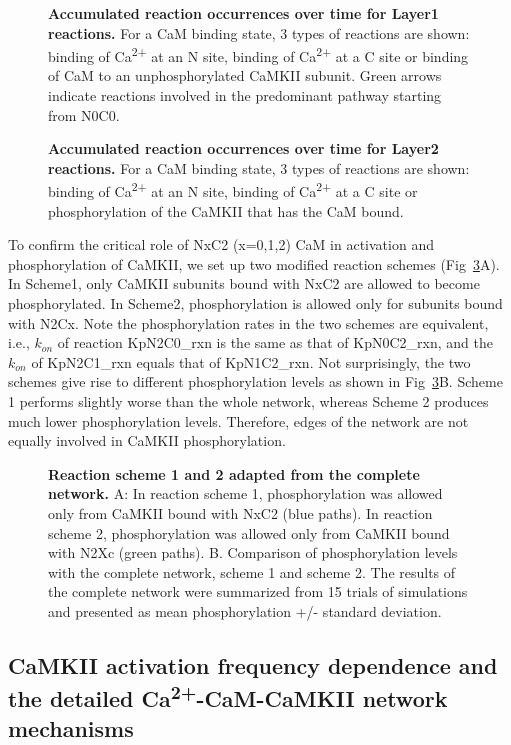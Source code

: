 \documentclass[10pt,letterpaper]{article}
\begin{document}
\begin{figure}[!h]
	\caption{{\bf Accumulated reaction occurrences over time for Layer1 reactions.}
	For a CaM binding state, 3 types of reactions are shown: binding of Ca\textsuperscript{2+} at an N site, binding of Ca\textsuperscript{2+} at a C site or binding of CaM to an unphosphorylated CaMKII subunit. Green arrows indicate reactions involved in the predominant pathway starting from N0C0.
	}
\label{fig4}
\end{figure}

\begin{figure}[!h]
	\caption{{\bf Accumulated reaction occurrences over time for Layer2 reactions.}
	For a CaM binding state, 3 types of reactions are shown: binding of Ca\textsuperscript{2+} at an N site, binding of Ca\textsuperscript{2+} at a C site or phosphorylation of the CaMKII that has the CaM bound.
	}
\label{fig5}
\end{figure}


To confirm the critical role of NxC2 (x=0,1,2) CaM in activation and phosphorylation of CaMKII, we set up two modified reaction schemes (Fig~\ref{fig6}A). In Scheme1, only CaMKII subunits bound with NxC2 are allowed to become phosphorylated. In Scheme2, phosphorylation is allowed only for subunits bound with N2Cx. Note the phosphorylation rates in the two schemes are equivalent, i.e., $k_{on}$ of reaction KpN2C0\_rxn is the same as that of KpN0C2\_rxn, and the $k_{on}$ of KpN2C1\_rxn equals that of KpN1C2\_rxn. Not surprisingly, the two schemes give rise to different phosphorylation levels as shown in Fig~\ref{fig6}B. Scheme 1 performs slightly worse than the whole network, whereas Scheme 2 produces much lower phosphorylation levels. Therefore, edges of the network are not equally involved in CaMKII phosphorylation. 

\begin{figure}[!h]
	\caption{{\bf Reaction scheme 1 and 2 adapted from the complete network.}
	A: In reaction scheme 1, phosphorylation was allowed only from CaMKII bound with NxC2 (blue paths). In reaction scheme 2, phosphorylation was allowed only from CaMKII bound with N2Xc (green paths).
	B. Comparison of phosphorylation levels with the complete network, scheme 1 and scheme 2. The results of the complete network were summarized from 15 trials of simulations and presented as mean phosphorylation +/- standard deviation.
	} 
\label{fig6}
\end{figure}


\subsection*{CaMKII activation frequency dependence and the detailed Ca\textsuperscript{2+}-CaM-CaMKII network mechanisms}
\end{document}
